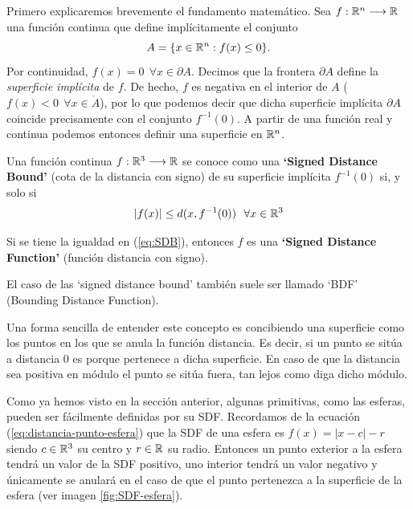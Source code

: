 Primero explicaremos brevemente el fundamento matemático. Sea $f:\mathbb{R}^n\longrightarrow\mathbb{R}$ una función continua que define implícitamente el conjunto 
$$
A = \{x\in\mathbb{R}^n: f(x)\leq 0\}.
$$
Por continuidad, $f(x)=0\ \ \forall x\in\partial A$. Decimos que la frontera $\partial A$ define la \textit{superficie implícita} de $f$. De hecho, $f$ es negativa en el interior de $A$ ($f(x)<0 \ \ \forall x\in\mathring A$), por lo que podemos decir que dicha superficie implícita $\partial A$ coincide precisamente con el conjunto $f^{-1}(0)$. A partir de una función real y continua podemos entonces definir una superficie en $\mathbb{R}^n$.

\begin{definicion}[SDF]
    Una función continua $f:\mathbb{R}^3\longrightarrow\mathbb{R}$ se conoce como una \textbf{`Signed Distance Bound'} (cota de la distancia con signo) de su superficie implícita $f^{-1}(0)$ si, y solo si
    \begin{equation}
        \label{eq:SDB}
        |f(x)|\leq d(x,f^{-1}(0)) \ \ \forall x\in\mathbb{R}^3
    \end{equation}
    
    Si se tiene la igualdad en (\ref{eq:SDB}), entonces $f$ es una \textbf{`Signed Distance Function'} (función distancia con signo).
\end{definicion}

El caso de las `signed distance bound' también suele ser llamado `BDF' (Bounding Distance Function).

Una forma sencilla de entender este concepto es concibiendo una superficie como los puntos en los que se anula la función distancia. Es decir, si un punto se sitúa a distancia 0 es porque pertenece a dicha superficie. En caso de que la distancia sea positiva en módulo el punto se sitúa fuera, tan lejos como diga dicho módulo.

Como ya hemos visto en la sección anterior, algunas primitivas, como las esferas, pueden ser fácilmente definidas por su SDF. Recordamos de la ecuación (\ref{eq:distancia-punto-esfera}) que la SDF de una esfera es $f(x)=|x-c|-r$ siendo $c\in\mathbb{R}^3$ su centro y $r\in\mathbb{R}$ su radio. Entonces un punto exterior a la esfera tendrá un valor de la SDF positivo, uno interior tendrá un valor negativo y únicamente se anulará en el caso de que el punto pertenezca a la superficie de la esfera (ver imagen \ref{fig:SDF-esfera}).

